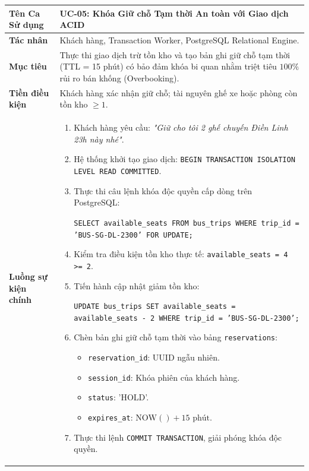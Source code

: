 \begin{table}[h!]
\centering
\small
\begin{tabular}{|p{3.2cm}|p{11.5cm}|}
\hline
\textbf{Tên Ca Sử dụng} & \textbf{UC-05: Khóa Giữ chỗ Tạm thời An toàn với Giao dịch ACID} \\
\hline
\textbf{Tác nhân} & Khách hàng, Transaction Worker, PostgreSQL Relational Engine. \\
\hline
\textbf{Mục tiêu} & Thực thi giao dịch trừ tồn kho và tạo bản ghi giữ chỗ tạm thời (TTL = 15 phút) có bảo đảm khóa bi quan nhằm triệt tiêu $100\%$ rủi ro bán khống (Overbooking). \\
\hline
\textbf{Tiền điều kiện} & Khách hàng xác nhận giữ chỗ; tài nguyên ghế xe hoặc phòng còn tồn kho $\ge 1$. \\
\hline
\textbf{Luồng sự kiện chính} & 
\begin{enumerate}
    \item Khách hàng yêu cầu: \textit{"Giữ cho tôi 2 ghế chuyến Điền Linh 23h này nhé"}.
    \item Hệ thống khởi tạo giao dịch: \texttt{BEGIN TRANSACTION ISOLATION LEVEL READ COMMITTED}.
    \item Thực thi câu lệnh khóa độc quyền cấp dòng trên PostgreSQL:
    \begin{center}
    \texttt{SELECT available\_seats FROM bus\_trips WHERE trip\_id = 'BUS-SG-DL-2300' FOR UPDATE;}
    \end{center}
    \item Kiểm tra điều kiện tồn kho thực tế: \texttt{available\_seats = 4 >= 2}.
    \item Tiến hành cập nhật giảm tồn kho:
    \begin{center}
    \texttt{UPDATE bus\_trips SET available\_seats = available\_seats - 2 WHERE trip\_id = 'BUS-SG-DL-2300';}
    \end{center}
    \item Chèn bản ghi giữ chỗ tạm thời vào bảng \texttt{reservations}:
    \begin{itemize}
        \item \texttt{reservation\_id}: UUID ngẫu nhiên.
        \item \texttt{session\_id}: Khóa phiên của khách hàng.
        \item \texttt{status}: 'HOLD'.
        \item \texttt{expires\_at}: $\text{NOW}() + 15\text{ phút}$.
    \end{itemize}
    \item Thực thi lệnh \texttt{COMMIT TRANSACTION}, giải phóng khóa độc quyền.

\end{enumerate}
\end{tabular}
\end{table}

